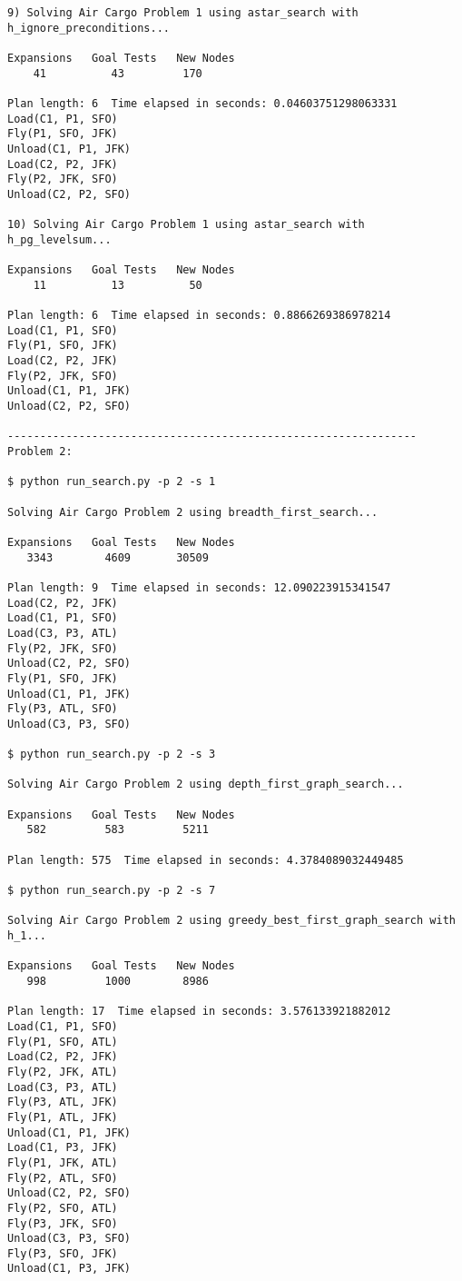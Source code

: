 \documentclass[11pt]{scrartcl}
\begin{document}
\begin{verbatim}
9) Solving Air Cargo Problem 1 using astar_search with h_ignore_preconditions...

Expansions   Goal Tests   New Nodes
    41          43         170

Plan length: 6  Time elapsed in seconds: 0.04603751298063331
Load(C1, P1, SFO)
Fly(P1, SFO, JFK)
Unload(C1, P1, JFK)
Load(C2, P2, JFK)
Fly(P2, JFK, SFO)
Unload(C2, P2, SFO)

10) Solving Air Cargo Problem 1 using astar_search with h_pg_levelsum...

Expansions   Goal Tests   New Nodes
    11          13          50

Plan length: 6  Time elapsed in seconds: 0.8866269386978214
Load(C1, P1, SFO)
Fly(P1, SFO, JFK)
Load(C2, P2, JFK)
Fly(P2, JFK, SFO)
Unload(C1, P1, JFK)
Unload(C2, P2, SFO)

---------------------------------------------------------------
Problem 2:

$ python run_search.py -p 2 -s 1

Solving Air Cargo Problem 2 using breadth_first_search...

Expansions   Goal Tests   New Nodes
   3343        4609       30509

Plan length: 9  Time elapsed in seconds: 12.090223915341547
Load(C2, P2, JFK)
Load(C1, P1, SFO)
Load(C3, P3, ATL)
Fly(P2, JFK, SFO)
Unload(C2, P2, SFO)
Fly(P1, SFO, JFK)
Unload(C1, P1, JFK)
Fly(P3, ATL, SFO)
Unload(C3, P3, SFO)

$ python run_search.py -p 2 -s 3

Solving Air Cargo Problem 2 using depth_first_graph_search...

Expansions   Goal Tests   New Nodes
   582         583         5211

Plan length: 575  Time elapsed in seconds: 4.3784089032449485

$ python run_search.py -p 2 -s 7

Solving Air Cargo Problem 2 using greedy_best_first_graph_search with h_1...

Expansions   Goal Tests   New Nodes
   998         1000        8986

Plan length: 17  Time elapsed in seconds: 3.576133921882012
Load(C1, P1, SFO)
Fly(P1, SFO, ATL)
Load(C2, P2, JFK)
Fly(P2, JFK, ATL)
Load(C3, P3, ATL)
Fly(P3, ATL, JFK)
Fly(P1, ATL, JFK)
Unload(C1, P1, JFK)
Load(C1, P3, JFK)
Fly(P1, JFK, ATL)
Fly(P2, ATL, SFO)
Unload(C2, P2, SFO)
Fly(P2, SFO, ATL)
Fly(P3, JFK, SFO)
Unload(C3, P3, SFO)
Fly(P3, SFO, JFK)
Unload(C1, P3, JFK)


\end{verbatim}
\end{document}
